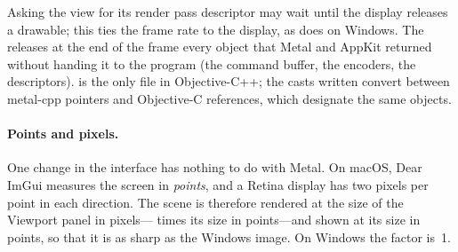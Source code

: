 
Asking the view for its render pass descriptor may wait until the display releases a drawable;
this ties the frame rate to the display, as  does on Windows. The
 releases at the end of the frame every object that Metal and AppKit
returned without handing it to the program (the command buffer, the encoders, the
descriptors).  is the only file in Objective-C++; the casts written
 convert between metal-cpp pointers and Objective-C references, which
designate the same objects.

\paragraph{Points and pixels.} One change in the interface has nothing to do with Metal. On
macOS, Dear ImGui measures the screen in \emph{points}, and a Retina display has two pixels per
point in each direction. The scene is therefore rendered at the size of the Viewport panel in
pixels--- times its size in points---and shown at its size in
points, so that it is as sharp as the Windows image. On Windows the factor is~1.

